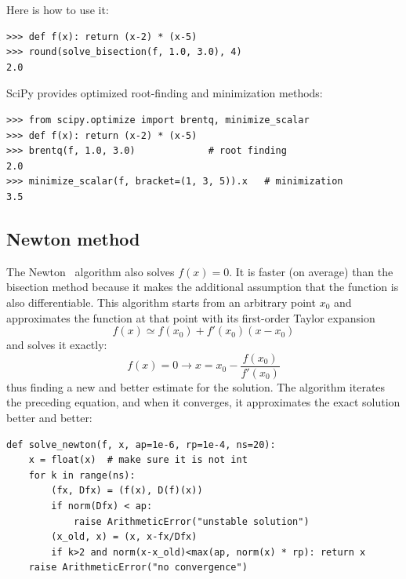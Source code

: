 \documentclass[justified, sixbynine]{tufte-book}
\def\ft{\small\tt}
\theoremstyle{plain}%
\newtheorem * {corollary}{Corollary}
\theoremstyle{definition}
\theoremstyle{remark}
\newtheorem * {remark}{Remark}
\newtheorem * {note}{Note}
\begin{document}
\begin{fullwidth}
Here is how to use it:

\begin{lstlisting}[caption={in file: {\ft nlib.py}}]
>>> def f(x): return (x-2) * (x-5)
>>> round(solve_bisection(f, 1.0, 3.0), 4)
2.0
\end{lstlisting}

SciPy provides optimized root-finding and minimization methods:

\begin{lstlisting}
>>> from scipy.optimize import brentq, minimize_scalar
>>> def f(x): return (x-2) * (x-5)
>>> brentq(f, 1.0, 3.0)             # root finding
2.0
>>> minimize_scalar(f, bracket=(1, 3, 5)).x   # minimization
3.5
\end{lstlisting}

\goodbreak\subsection{Newton method}


The Newton~\cite{newton} algorithm also solves $f(x)=0$. It is faster (on average) than the bisection method because it makes the additional assumption that the function is also differentiable. This algorithm starts from an arbitrary point $x_0$ and approximates the function at that point with its first-order Taylor expansion
\begin{equation}
f(x) \simeq f(x_0) + f'(x_0)(x-x_0)
\end{equation}
and solves it exactly:
\begin{equation}
f(x) = 0 \rightarrow x = x_0 - \frac{f(x_0)}{f'(x_0)}
\end{equation}
thus finding a new and better estimate for the solution. The algorithm iterates the preceding equation, and when it converges, it approximates the exact solution better and better:

\begin{lstlisting}[caption={in file: {\ft nlib.py}}]
def solve_newton(f, x, ap=1e-6, rp=1e-4, ns=20):
    x = float(x)  # make sure it is not int
    for k in range(ns):
        (fx, Dfx) = (f(x), D(f)(x))
        if norm(Dfx) < ap:
            raise ArithmeticError("unstable solution")
        (x_old, x) = (x, x-fx/Dfx)
        if k>2 and norm(x-x_old)<max(ap, norm(x) * rp): return x
    raise ArithmeticError("no convergence")
\end{lstlisting}


\end{fullwidth}
\end{document}
